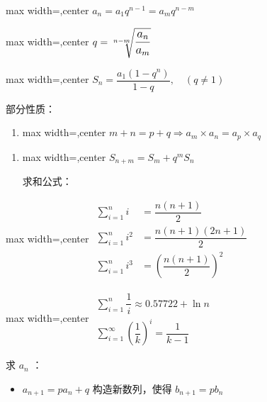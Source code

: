 \documentclass[twocolumn,10pt]{ctexart}
\begin{document}
\begin{adjustbox}{max width=\linewidth,center}
$a_n=a_1q^{n-1}=a_mq^{n-m}$
\end{adjustbox}

\begin{adjustbox}{max width=\linewidth,center}
$q=\large{\sqrt[n-m]{\dfrac{a_n}{a_m}}}$
\end{adjustbox}

\begin{adjustbox}{max width=\linewidth,center}
$S_n=\dfrac{a_1(1-q^n)}{1-q},\quad(q\neq1)$
\end{adjustbox}

部分性质：

\begin{enumerate}
\item \begin{adjustbox}{max width=\linewidth,center}
$m+n=p+q\Rightarrow a_m\times a_n=a_p\times a_q$
\end{adjustbox}
\end{enumerate}

\begin{enumerate}
\item \begin{adjustbox}{max width=\linewidth,center}
$S_{n+m}=S_m+q^mS_n$
\end{adjustbox}

求和公式：
\end{enumerate}

\begin{adjustbox}{max width=\linewidth,center}
$\begin{aligned}
\sum_{i=1}^ni&=\dfrac{n(n+1)}2\\
\sum_{i=1}^ni^2&=\dfrac{n(n+1)(2n+1)}2\\
\sum_{i=1}^ni^3&=\left(\dfrac{n(n+1)}2\right)^2
\end{aligned}$
\end{adjustbox}

\begin{adjustbox}{max width=\linewidth,center}
$\begin{gathered}
\sum_{i=1}^n\dfrac1i\approx0.57722+\ln n\\
\sum_{i=1}^\infty\left(\dfrac1k\right)^i=\dfrac1{k-1}
\end{gathered}$
\end{adjustbox}

求 $a_n$ ：

\begin{itemize}
\item $a_{n+1}=pa_n+q$ 构造新数列，使得 $b_{n+1}=pb_n$
\end{itemize}
\end{document}
